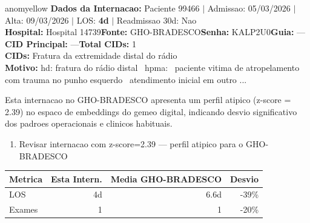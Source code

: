\documentclass[a4paper,10pt]{article}
\begin{document}
\begin{anomalycard}[Internacao 119962 | GHO-BRADESCO | MODERADO (z=2.39)]{anomyellow}
\textbf{Dados da Internacao:} Paciente 99466 $\mid$ Admissao: 05/03/2026 $\mid$ Alta: 09/03/2026 $\mid$ LOS: \textbf{4d} $\mid$ Readmissao 30d: Nao\\
\textbf{Hospital:} Hospital 14739\quad\textbf{Fonte:} GHO-BRADESCO\quad\textbf{Senha:} KALP2U0\quad\textbf{Guia:} ---\\
\textbf{CID Principal:} {\small ---}\quad\textbf{Total CIDs:} 1\\

\textbf{CIDs:} {\scriptsize Fratura da extremidade distal do rádio}\\

\textbf{Motivo:} {\scriptsize hd: fratura do rádio distal  hpma:  paciente vitima de atropelamento com trauma no punho esquerdo  atendimento inicial em outro ...}\\

\vspace{2pt}\begin{tcolorbox}[colback=severityred!20,colframe=anomyellow,title={\textbf{Interpretacao de Negocio}},fonttitle=\bfseries\small,left=4pt,right=4pt,top=3pt,bottom=3pt]
{\small Esta internacao no GHO-BRADESCO apresenta um perfil atipico (z-score = 2.39) no espaco de embeddings do gemeo digital, indicando desvio significativo dos padroes operacionais e clinicos habituais.}
\end{tcolorbox}
\begin{tcolorbox}[colback=severityyellow!30,colframe=anomorange,title={\textbf{Recomendacoes Especificas}},fonttitle=\bfseries\small,left=4pt,right=4pt,top=3pt,bottom=3pt]
\begin{enumerate}[nosep,leftmargin=16pt]
\item {\small Revisar internacao com z-score=2.39 --- perfil atipico para o GHO-BRADESCO}
\end{enumerate}
\end{tcolorbox}
\begin{center}\begin{tabular}{l r r r}\toprule\textbf{Metrica} & \textbf{Esta Intern.} & \textbf{Media GHO-BRADESCO} & \textbf{Desvio} \\\midrule
LOS & 4d & 6.6d & -39\% \\
Exames & 1 & 1 & -20\% \\
\bottomrule\end{tabular}\end{center}


\end{anomalycard}
\end{document}
